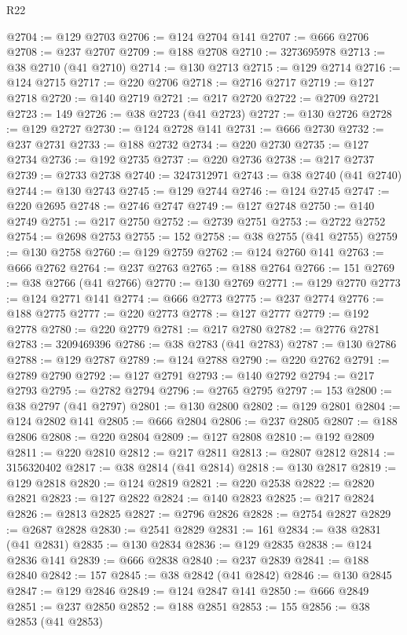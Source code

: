 \begin{lexlean}{R22}
\begin{coremodule}
@2704 := @129 @2703
@2706 := @124 @2704 @141
@2707 := @666 @2706
@2708 := @237 @2707
@2709 := @188 @2708
@2710 := 3273695978
@2713 := @38 @2710 (@41 @2710)
@2714 := @130 @2713
@2715 := @129 @2714
@2716 := @124 @2715
@2717 := @220 @2706
@2718 := @2716 @2717
@2719 := @127 @2718
@2720 := @140 @2719
@2721 := @217 @2720
@2722 := @2709 @2721
@2723 := 149
@2726 := @38 @2723 (@41 @2723)
@2727 := @130 @2726
@2728 := @129 @2727
@2730 := @124 @2728 @141
@2731 := @666 @2730
@2732 := @237 @2731
@2733 := @188 @2732
@2734 := @220 @2730
@2735 := @127 @2734
@2736 := @192 @2735
@2737 := @220 @2736
@2738 := @217 @2737
@2739 := @2733 @2738
@2740 := 3247312971
@2743 := @38 @2740 (@41 @2740)
@2744 := @130 @2743
@2745 := @129 @2744
@2746 := @124 @2745
@2747 := @220 @2695
@2748 := @2746 @2747
@2749 := @127 @2748
@2750 := @140 @2749
@2751 := @217 @2750
@2752 := @2739 @2751
@2753 := @2722 @2752
@2754 := @2698 @2753
@2755 := 152
@2758 := @38 @2755 (@41 @2755)
@2759 := @130 @2758
@2760 := @129 @2759
@2762 := @124 @2760 @141
@2763 := @666 @2762
@2764 := @237 @2763
@2765 := @188 @2764
@2766 := 151
@2769 := @38 @2766 (@41 @2766)
@2770 := @130 @2769
@2771 := @129 @2770
@2773 := @124 @2771 @141
@2774 := @666 @2773
@2775 := @237 @2774
@2776 := @188 @2775
@2777 := @220 @2773
@2778 := @127 @2777
@2779 := @192 @2778
@2780 := @220 @2779
@2781 := @217 @2780
@2782 := @2776 @2781
@2783 := 3209469396
@2786 := @38 @2783 (@41 @2783)
@2787 := @130 @2786
@2788 := @129 @2787
@2789 := @124 @2788
@2790 := @220 @2762
@2791 := @2789 @2790
@2792 := @127 @2791
@2793 := @140 @2792
@2794 := @217 @2793
@2795 := @2782 @2794
@2796 := @2765 @2795
@2797 := 153
@2800 := @38 @2797 (@41 @2797)
@2801 := @130 @2800
@2802 := @129 @2801
@2804 := @124 @2802 @141
@2805 := @666 @2804
@2806 := @237 @2805
@2807 := @188 @2806
@2808 := @220 @2804
@2809 := @127 @2808
@2810 := @192 @2809
@2811 := @220 @2810
@2812 := @217 @2811
@2813 := @2807 @2812
@2814 := 3156320402
@2817 := @38 @2814 (@41 @2814)
@2818 := @130 @2817
@2819 := @129 @2818
@2820 := @124 @2819
@2821 := @220 @2538
@2822 := @2820 @2821
@2823 := @127 @2822
@2824 := @140 @2823
@2825 := @217 @2824
@2826 := @2813 @2825
@2827 := @2796 @2826
@2828 := @2754 @2827
@2829 := @2687 @2828
@2830 := @2541 @2829
@2831 := 161
@2834 := @38 @2831 (@41 @2831)
@2835 := @130 @2834
@2836 := @129 @2835
@2838 := @124 @2836 @141
@2839 := @666 @2838
@2840 := @237 @2839
@2841 := @188 @2840
@2842 := 157
@2845 := @38 @2842 (@41 @2842)
@2846 := @130 @2845
@2847 := @129 @2846
@2849 := @124 @2847 @141
@2850 := @666 @2849
@2851 := @237 @2850
@2852 := @188 @2851
@2853 := 155
@2856 := @38 @2853 (@41 @2853)

\end{coremodule}
\end{lexlean}
